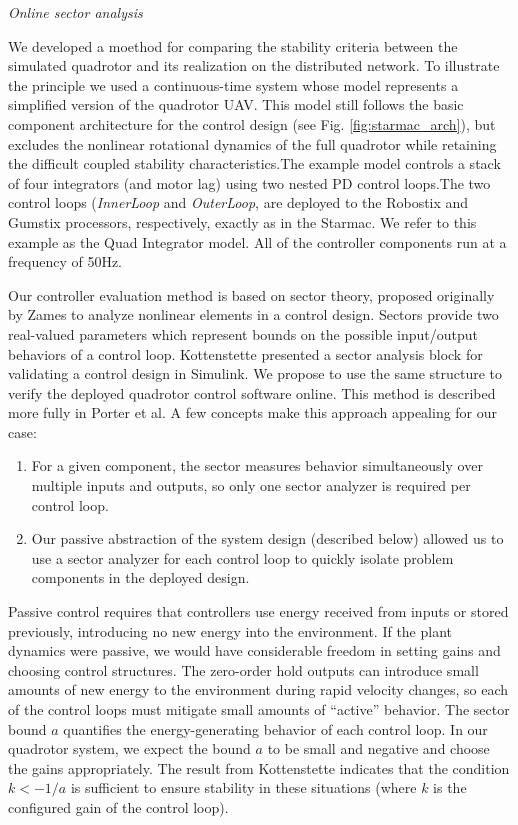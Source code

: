 \emph{Online sector analysis}

We developed a moethod for comparing the stability criteria between the simulated quadrotor and its realization on the distributed network.
To illustrate the principle we used a continuous-time system whose model represents a simplified version of the quadrotor UAV.   This model still follows the  
basic component architecture for the control design (see Fig. \ref{fig:starmac_arch}), but excludes the nonlinear rotational 
dynamics of the full quadrotor while retaining
the difficult coupled stability characteristics.The 
example model controls a stack of four integrators (and motor lag) 
using two nested PD control loops.The two control loops (\emph{InnerLoop} and \emph{OuterLoop},
are deployed to the Robostix and Gumstix
processors, respectively, exactly as in the Starmac.  We refer to this example as the Quad Integrator model.  All of the controller components run at a frequency of 50Hz.  


Our controller evaluation method is based on sector theory, proposed originally by Zames to analyze nonlinear elements in a control design.  Sectors provide two real-valued parameters which represent bounds on the possible input/output behaviors of a control loop.  Kottenstette presented a sector analysis block for validating a control design in Simulink\cite{nk_qr_tr}.  We propose to use the same structure to verify the deployed quadrotor control software online.  This method is described more fully in Porter et al\cite{jp_online_stability}.  A few concepts make this approach appealing for our case:

\begin{enumerate}
 \item For a given component, the sector measures behavior simultaneously over multiple inputs and outputs, so only one sector analyzer is required per control loop.
 \item Our passive abstraction of the system design (described below) allowed us to use a sector analyzer for each control loop to quickly isolate problem components in the deployed design.
\end{enumerate}

Passive control requires that controllers use energy received from inputs or stored previously, introducing no new energy into the environment. If the plant dynamics were passive, we would have considerable freedom in setting gains and choosing control structures.  The zero-order hold outputs can introduce small amounts of new energy to the environment during rapid velocity changes, so each of the control loops must mitigate small amounts of ``active'' behavior.  The sector bound $a$ quantifies the energy-generating behavior of each control loop. In our quadrotor system, we expect the bound $a$ to be small and negative and choose the gains appropriately.  The result from Kottenstette indicates that the condition $k < -1/a$ is sufficient to ensure stability in these situations (where $k$ is the configured gain of the control loop)\cite{nk_qr_tr}.

